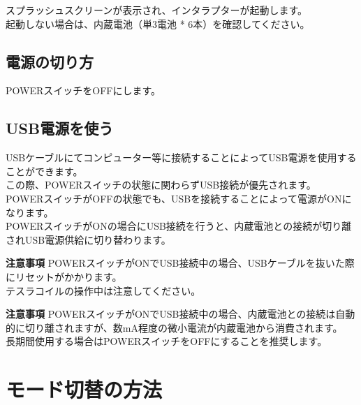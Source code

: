 \documentclass[a4paper,11pt]{jsarticle}
\begin{document}
スプラッシュスクリーンが表示され、インタラプターが起動します。 \\
起動しない場合は、内蔵電池（単3電池 * 6本）を確認してください。 \\

\vspace*{5mm}


\subsection{電源の切り方}

POWERスイッチをOFFにします。 \\

\vspace*{5mm}


\subsection{USB電源を使う}

USBケーブルにてコンピューター等に接続することによってUSB電源を使用することができます。 \\
この際、POWERスイッチの状態に関わらずUSB接続が優先されます。 \\
POWERスイッチがOFFの状態でも、USBを接続することによって電源がONになります。 \\
POWERスイッチがONの場合にUSB接続を行うと、内蔵電池との接続が切り離されUSB電源供給に切り替わります。 \\

\vspace*{5mm}

\begin{itembox}[l]{\textbf{注意事項}}
POWERスイッチがONでUSB接続中の場合、USBケーブルを抜いた際にリセットがかかります。 \\
テスラコイルの操作中は注意してください。
\end{itembox}

\vspace*{5mm}

\begin{itembox}[l]{\textbf{注意事項}}
POWERスイッチがONでUSB接続中の場合、内蔵電池との接続は自動的に切り離されますが、数mA程度の微小電流が内蔵電池から消費されます。 \\
長期間使用する場合はPOWERスイッチをOFFにすることを推奨します。
\end{itembox}



\clearpage


\section{モード切替の方法}
\end{document}
